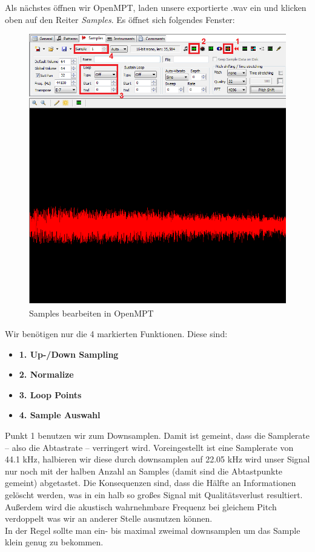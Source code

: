 Als nächstes öffnen wir OpenMPT, laden unsere exportierte .wav ein und klicken oben auf den Reiter \textit{Samples}. Es öffnet sich folgendes Fenster:

\begin{figure}[htbp] \centering
	\includegraphics[width=.95\linewidth]{images/OpenMTP.png}
	\caption{Samples bearbeiten in OpenMPT}
	\label{OpenMTP}
\end{figure}

\bigskip

Wir benötigen nur die 4 markierten Funktionen. Diese sind:

\medskip

\begin{itemize}
	\item \textbf{1. Up-/Down Sampling}
	\item \textbf{2. Normalize}
	\item \textbf{3. Loop Points}
	\item \textbf{4. Sample Auswahl} 
\end{itemize}

\medskip

Punkt 1 benutzen wir zum Downsamplen. Damit ist gemeint, dass die Samplerate -- also die Abtastrate -- verringert wird. Voreingestellt ist eine Samplerate von 44.1 kHz, halbieren wir diese durch downsamplen auf 22.05 kHz wird unser Signal nur noch mit der halben Anzahl an Samples (damit sind die Abtastpunkte gemeint) abgetastet. Die Konsequenzen sind, dass die Hälfte an Informationen gelöscht werden, was in ein halb so großes Signal mit Qualitätsverlust resultiert. Außerdem wird die akustisch wahrnehmbare Frequenz bei gleichem Pitch verdoppelt was wir an anderer Stelle ausnutzen können. \\
In der Regel sollte man ein- bis maximal zweimal downsamplen um das Sample klein genug zu bekommen.

